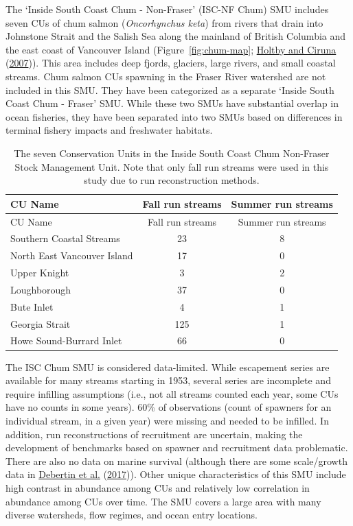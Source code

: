 \documentclass[11pt]{book}
\begin{document}
The `Inside South Coast Chum - Non-Fraser' (ISC-NF Chum) SMU includes seven CUs of chum salmon (\emph{Oncorhynchus keta}) from rivers that drain into Johnstone Strait and the Salish Sea along the mainland of British Columbia and the east coast of Vancouver Island (Figure~\ref{fig:chum-map}; \protect\hyperlink{ref-holtbyConservationUnitsPacific2007}{Holtby and Ciruna} (\protect\hyperlink{ref-holtbyConservationUnitsPacific2007}{2007})). This area includes deep fjords, glaciers, large rivers, and small coastal streams. Chum salmon CUs spawning in the Fraser River watershed are not included in this SMU. They have been categorized as a separate `Inside South Coast Chum - Fraser' SMU. While these two SMUs have substantial overlap in ocean fisheries, they have been separated into two SMUs based on differences in terminal fishery impacts and freshwater habitats.
\begin{longtable}[]{@{}lcc@{}}
\caption{\label{tab:CU-summary}The seven Conservation Units in the Inside South Coast Chum Non-Fraser Stock Management Unit. Note that only fall run streams were used in this study due to run reconstruction methods.}\tabularnewline
\toprule
CU Name & Fall run streams & Summer run streams \\
\midrule
\endfirsthead
\toprule
CU Name & Fall run streams & Summer run streams \\
\midrule
\endhead
Southern Coastal Streams & 23 & 8 \\
North East Vancouver Island & 17 & 0 \\
Upper Knight & 3 & 2 \\
Loughborough & 37 & 0 \\
Bute Inlet & 4 & 1 \\
Georgia Strait & 125 & 1 \\
Howe Sound-Burrard Inlet & 66 & 0 \\
\bottomrule
\end{longtable}
The ISC Chum SMU is considered data-limited. While escapement series are available for many streams starting in 1953, several series are incomplete and require infilling assumptions (i.e., not all streams counted each year, some CUs have no counts in some years). 60\% of observations (count of spawners for an individual stream, in a given year) were missing and needed to be infilled. In addition, run reconstructions of recruitment are uncertain, making the development of benchmarks based on spawner and recruitment data problematic. There are also no data on marine survival (although there are some scale/growth data in \protect\hyperlink{ref-debertinMarineGrowthPatterns2017}{Debertin et al.} (\protect\hyperlink{ref-debertinMarineGrowthPatterns2017}{2017})). Other unique characteristics of this SMU include high contrast in abundance among CUs and relatively low correlation in abundance among CUs over time. The SMU covers a large area with many diverse watersheds, flow regimes, and ocean entry locations.
\end{document}
